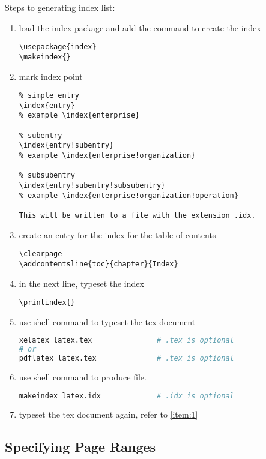 Steps to generating index list:
\begin{enumerate}
\item load the index package and add the command to create the index
\begin{lstlisting}
\usepackage{index}
\makeindex{}
\end{lstlisting}

\item mark index point
\begin{lstlisting}
% simple entry
\index{entry}
% example \index{enterprise}                   

% subentry
\index{entry!subentry}          
% example \index{enterprise!organization}

% subsubentry
\index{entry!subentry!subsubentry} 
% example \index{enterprise!organization!operation}

This will be written to a file with the extension .idx.
\end{lstlisting}

\item create an entry for the index for the table of contents
\begin{lstlisting}
\clearpage
\addcontentsline{toc}{chapter}{Index}
\end{lstlisting}

\item in the next line, typeset the index
\begin{lstlisting}
\printindex{}
\end{lstlisting}

\item use shell command to typeset the tex document \label{item:1}
\begin{lstlisting}[language=sh]
xelatex latex.tex               # .tex is optional
# or
pdflatex latex.tex              # .tex is optional
\end{lstlisting}
  
\item use shell command to produce  file.
\begin{lstlisting}[language=sh]
makeindex latex.idx             # .idx is optional
\end{lstlisting}
  
\item typeset the tex document again, refer to \ref{item:1}
  
\end{enumerate}


\subsection{Specifying Page Ranges}
\label{sec:spec-page-rang}


